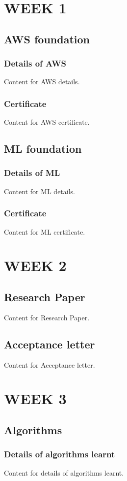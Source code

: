 
\chapter{WEEK 1}
\section{AWS foundation}
\subsection{Details of AWS}
Content for AWS details.
\subsection{Certificate}
Content for AWS certificate.

\section{ML foundation}
\subsection{Details of ML}
Content for ML details.
\subsection{Certificate}
Content for ML certificate.

\chapter{WEEK 2}
\section{Research Paper}
Content for Research Paper.
\section{Acceptance letter}
Content for Acceptance letter.

\chapter{WEEK 3}
\section{Algorithms}
\subsection{Details of algorithms learnt}
Content for details of algorithms learnt.

